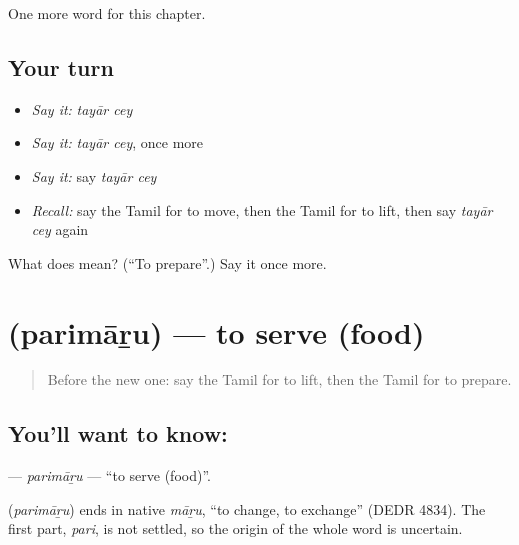 \begin{grammarlens}[title={What you've built}]
One more word for this chapter.
\end{grammarlens}

\subsection*{Your turn}
\begin{itemize}
\raggedright
  \item \emph{Say it:} \emph{tayār cey}
  \item \emph{Say it:} \emph{tayār cey}, once more
  \item \emph{Say it:} say \emph{tayār cey}
  \item \emph{Recall:} say the Tamil for to move, then the Tamil for to lift, then say \emph{tayār cey} again
\end{itemize}

\begin{tcolorbox}[breakable,colback=teal!4,colframe=teal!35!black,title={Before you move on}]
What does   mean? (\textquotedblleft{}To prepare\textquotedblright{}.) Say it once more.
\end{tcolorbox}
\section[\texorpdfstring{\ta{பரிமாறு} (parimāṟu)}{பரிமாறு (parimāṟu)}]{ (parimāṟu) — to serve (food)}

\label{lesson:TA-C163-parimaru}



\begin{quote}
Before the new one: say the Tamil for to lift, then the Tamil for to prepare.
\end{quote}

\subsection*{You'll want to know: }
\textbf{} — \emph{parimāṟu} — \textquotedblleft{}to serve (food)\textquotedblright{}.

\begin{cousinweb}
\textbf{} (\emph{parimāṟu}) ends in native \emph{māṟu}, \textquotedblleft{}to change, to exchange\textquotedblright{} (DEDR 4834). The first part, \emph{pari}, is not settled, so the origin of the whole word is uncertain.
\end{cousinweb}

